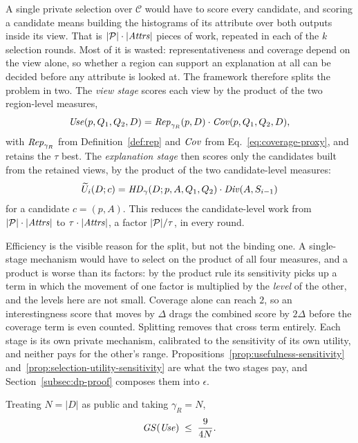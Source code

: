 A single private selection over $\mathcal{C}$ would have to score every candidate, and scoring a candidate means building the histograms of its attribute over both outputs inside its view.
That is $|\mathcal{P}|\cdot|\mathit{Attrs}|$ pieces of work, repeated in each of the $k$ selection rounds.
Most of it is wasted: representativeness and coverage depend on the view alone, so whether a region can support an explanation at all can be decided before any attribute is looked at.
The framework therefore splits the problem in two.
The \emph{view stage} scores each view by the product of the two region-level measures,
\begin{equation}
\mathit{Use}(p,Q_1,Q_2,D)= \mathit{Rep}_{\gamma_R}(p,D)\cdot \mathit{Cov}(p,Q_1,Q_2,D),
\label{eq:usefulness-proxy}
\end{equation}
with $\mathit{Rep}_{\gamma_R}$ from Definition~\ref{def:rep} and $\mathit{Cov}$ from Eq.~\eqref{eq:coverage-proxy}, and retains the $\tau$ best.
The \emph{explanation stage} then scores only the candidates built from the retained views, by the product of the two candidate-level measures:
\begin{equation}
\widetilde{U}_i(D;c)=\mathit{HD}_{\gamma}(D;p,A,Q_1,Q_2)\cdot \mathit{Div}(A,S_{i-1})
\label{eq:selection-utility}
\end{equation}
for a candidate $c=(p,A)$.
This reduces the candidate-level work from $|\mathcal{P}|\cdot|\mathit{Attrs}|$ to $\tau\cdot|\mathit{Attrs}|$, a factor $|\mathcal{P}|/\tau$, in every round.

Efficiency is the visible reason for the split, but not the binding one.
A single-stage mechanism would have to select on the product of all four measures, and a product is worse than its factors: by the product rule its sensitivity picks up a term in which the movement of one factor is multiplied by the \emph{level} of the other, and the levels here are not small.
Coverage alone can reach $2$, so an interestingness score that moves by $\Delta$ drags the combined score by $2\Delta$ before the coverage term is even counted.
Splitting removes that cross term entirely.
Each stage is its own private mechanism, calibrated to the sensitivity of its own utility, and neither pays for the other's range.
Propositions~\ref{prop:usefulness-sensitivity} and~\ref{prop:selection-utility-sensitivity} are what the two stages pay, and Section~\ref{subsec:dp-proof} composes them into $\epsilon$.

\begin{proposition}
\label{prop:usefulness-sensitivity}
Treating $N=|D|$ as public and taking $\gamma_R=N$,
\[
\mathit{GS}(\mathit{Use})\;\le\;\frac{9}{4N}.
\]
\end{proposition}

